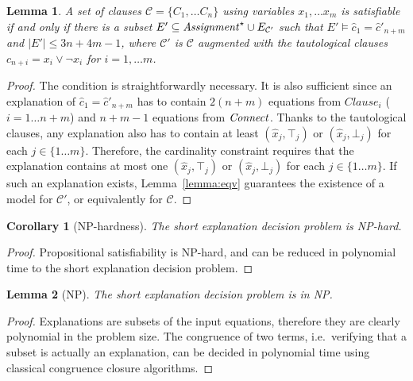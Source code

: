 \documentclass{easychair}
\newtheorem{corollary}{Corollary}
\newtheorem{lemma}{Lemma}
\begin{document}

\begin{lemma}
A set of clauses $\mathcal{C}= \{C_1, \dots C_n\}$ using variables $x_1,\dots
x_m$ is satisfiable if and only if there is a subset $E' \subseteq
{\it Assignment}^\star \cup E_{\mathcal{C}'}$ such that $E'\models \hat{c}_1 =
\hat{c}'_{n+m}$ and $|E'| \leq 3n+4m-1$, where $\mathcal{C}'$ is $\mathcal{C}$
augmented with the tautological clauses $c_{n+i} = x_i \vee \neg x_i$ for
$i=1,\dots m$.
\end{lemma}
\begin{proof}
The condition is straightforwardly necessary.  It is also sufficient since an
explanation of $\hat{c}_1 = \hat{c}'_{n+m}$ has to contain $2(n + m)$
equations from $Clause_i$ ($i= 1\dots n + m$) and $n + m - 1$ equations from
${\it Connect}$.  Thanks to the tautological clauses, any explanation also has to
contain at least $(\hat{x}_j,\top_j)$ or $(\hat{x}_j,\bot_j)$ for each
$j\in\{1\dots m\}$. Therefore, the cardinality constraint requires that the explanation
contains at most one $(\hat{x}_j,\top_j)$ or $(\hat{x}_j,\bot_j)$ for each
$j\in\{1\dots m\}$.  If such an explanation exists, Lemma~\ref{lemma:eqv}
guarantees the existence of a model for $\mathcal{C'}$, or equivalently for
$\mathcal{C}$.
\end{proof}




\begin{corollary}[NP-hardness]
\label{lemma:nphardness}
The short explanation decision problem is NP-hard.
\end{corollary}
\begin{proof}
Propositional satisfiability is NP-hard, and can be reduced in polynomial time
to the short explanation decision problem.
\end{proof}

\begin{lemma}[NP]
\label{lemma:innp}
The short explanation decision problem is in NP.
\end{lemma}
\begin{proof}
Explanations are subsets of the input equations, therefore they are clearly
polynomial in the problem size.  The congruence of two terms, i.e.\ verifying
that a subset is actually an explanation, can be decided in polynomial
time using classical congruence closure algorithms.
\end{proof}
\end{document}
